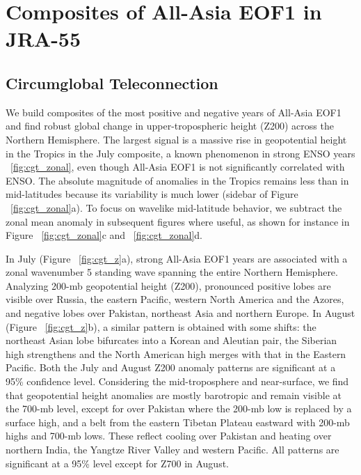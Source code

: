 \section{Composites of All-Asia EOF1 in JRA-55}

\subsection{Circumglobal Teleconnection}

	We build composites of the most positive and negative years of All-Asia EOF1 and find robust global change in upper-tropospheric height (Z200) across the Northern Hemisphere. The largest signal is a massive rise in geopotential height in the Tropics in the July composite, a known phenomenon in strong ENSO years ~\ref{fig:cgt_zonal}, even though All-Asia EOF1 is not significantly correlated with ENSO. The absolute magnitude of anomalies in the Tropics remains less than in mid-latitudes because its variability is much lower (sidebar of Figure ~\ref{fig:cgt_zonal}a). To focus on wavelike mid-latitude behavior, we subtract the zonal mean anomaly in subsequent figures where useful, as shown for instance in Figure ~\ref{fig:cgt_zonal}c and ~\ref{fig:cgt_zonal}d.
	
	In July (Figure ~\ref{fig:cgt_z}a), strong All-Asia EOF1 years are associated with a zonal wavenumber 5 standing wave spanning the entire Northern Hemisphere. Analyzing 200-mb geopotential height (Z200),  pronounced positive lobes are visible over Russia, the eastern Pacific, western North America and the Azores, and negative lobes over Pakistan, northeast Asia and northern Europe. In August (Figure ~\ref{fig:cgt_z}b), a similar pattern is obtained with some shifts: the northeast Asian lobe bifurcates into a Korean and Aleutian pair, the Siberian high strengthens and the North American high merges with that in the Eastern Pacific. Both the July and August Z200 anomaly patterns are significant at a 95\% confidence level. Considering the mid-troposphere and near-surface, we find that geopotential height anomalies are mostly barotropic and remain visible at the 700-mb level, except for over Pakistan where the 200-mb low is replaced by a surface high, and a belt from the eastern Tibetan Plateau eastward with 200-mb highs and 700-mb lows. These reflect cooling over Pakistan and heating over northern India, the Yangtze River Valley and western Pacific. All patterns are significant at a 95\% level except for Z700 in August.
	
